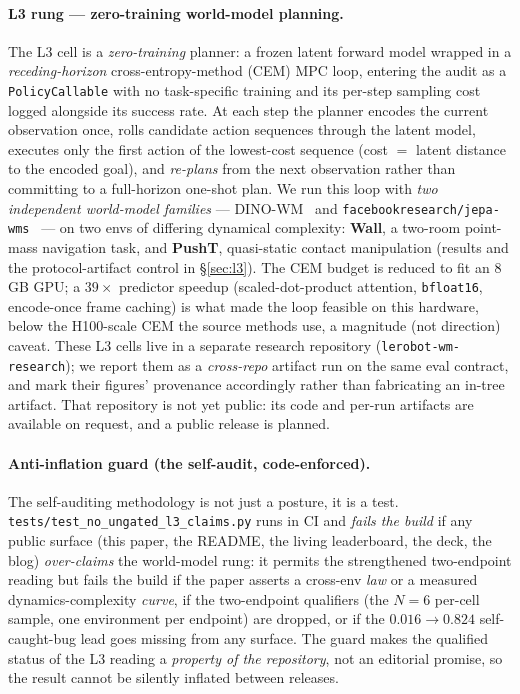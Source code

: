 \documentclass[10pt]{article}
\begin{document}
\paragraph{L3 rung --- zero-training world-model planning.}
The L3 cell is a \emph{zero-training} planner: a frozen latent forward
model wrapped in a \emph{receding-horizon} cross-entropy-method (CEM) MPC
loop, entering the audit as a \texttt{PolicyCallable} with no task-specific
training and its per-step sampling cost logged alongside its success rate.
At each step the planner encodes the current observation once, rolls
candidate action sequences through the latent model, executes only the
first action of the lowest-cost sequence (cost ${=}$ latent distance to
the encoded goal), and \emph{re-plans} from the next
observation rather than committing to a full-horizon one-shot plan. We run
this loop with \emph{two independent world-model families} ---
DINO-WM~\cite{zhou2024dinowm} and
\texttt{facebookresearch/jepa-wms}~\cite{assran2025vjepa2} --- on two envs
of differing dynamical complexity: \textbf{Wall}, a two-room point-mass
navigation task, and \textbf{PushT}, quasi-static contact manipulation
(results and the protocol-artifact control in \S\ref{sec:l3}). The CEM
budget is reduced to fit an 8\,GB GPU; a $39\times$ predictor speedup
(scaled-dot-product attention, \texttt{bfloat16}, encode-once frame
caching) is what made the loop feasible on this hardware, below the
H100-scale CEM the source methods use, a magnitude (not direction) caveat.
These L3 cells live in a separate research repository
(\texttt{lerobot-wm-research}); we report them as a \emph{cross-repo}
artifact run on the same eval contract, and mark their figures'
provenance accordingly rather than fabricating an in-tree artifact. That
repository is not yet public: its code and per-run artifacts are available
on request, and a public release is planned.

\paragraph{Anti-inflation guard (the self-audit, code-enforced).}
\label{sec:guard}
The self-auditing methodology is not just a posture, it is a test.
\texttt{tests/test\_no\_ungated\_l3\_claims.py} runs in CI and \emph{fails
the build} if any public surface (this paper, the README, the living
leaderboard, the deck, the blog) \emph{over-claims} the world-model rung:
it permits the strengthened two-endpoint reading but fails the build if
the paper asserts a cross-env \emph{law} or a measured
dynamics-complexity \emph{curve}, if the two-endpoint qualifiers (the
$N{=}6$ per-cell sample, one environment per endpoint) are dropped, or if
the $0.016\to0.824$ self-caught-bug lead goes missing from any surface.
The guard makes the
qualified status of the L3 reading a \emph{property of the repository}, not
an editorial promise, so the result cannot be silently inflated
between releases.
\end{document}
